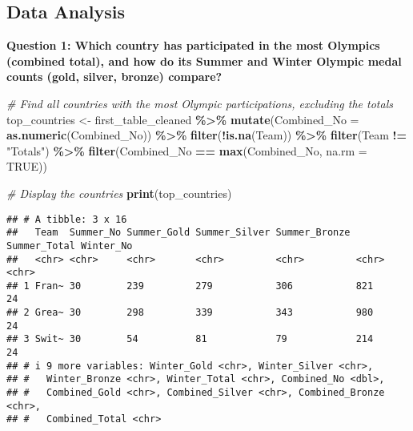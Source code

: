 \documentclass[
]{article}
\newenvironment{Shaded}{\begin{snugshade}}{\end{snugshade}}
\newcommand{\AttributeTok}[1]{\textcolor[rgb]{0.13,0.29,0.53}{#1}}
\newcommand{\CommentTok}[1]{\textcolor[rgb]{0.56,0.35,0.01}{\textit{#1}}}
\newcommand{\ConstantTok}[1]{\textcolor[rgb]{0.56,0.35,0.01}{#1}}
\newcommand{\FunctionTok}[1]{\textcolor[rgb]{0.13,0.29,0.53}{\textbf{#1}}}
\newcommand{\NormalTok}[1]{#1}
\newcommand{\OtherTok}[1]{\textcolor[rgb]{0.56,0.35,0.01}{#1}}
\newcommand{\SpecialCharTok}[1]{\textcolor[rgb]{0.81,0.36,0.00}{\textbf{#1}}}
\newcommand{\StringTok}[1]{\textcolor[rgb]{0.31,0.60,0.02}{#1}}
\begin{document}
\subsection{Data Analysis}\label{data-analysis}

\textbf{Question 1: Which country has participated in the most Olympics
(combined total), and how do its Summer and Winter Olympic medal counts
(gold, silver, bronze) compare?}

\begin{Shaded}
\begin{Highlighting}[]
\CommentTok{\# Find all countries with the most Olympic participations, excluding the totals}
\NormalTok{top\_countries }\OtherTok{\textless{}{-}}\NormalTok{ first\_table\_cleaned }\SpecialCharTok{\%\textgreater{}\%}
  \FunctionTok{mutate}\NormalTok{(}\AttributeTok{Combined\_No =} \FunctionTok{as.numeric}\NormalTok{(Combined\_No)) }\SpecialCharTok{\%\textgreater{}\%}
  \FunctionTok{filter}\NormalTok{(}\SpecialCharTok{!}\FunctionTok{is.na}\NormalTok{(Team)) }\SpecialCharTok{\%\textgreater{}\%} 
  \FunctionTok{filter}\NormalTok{(Team }\SpecialCharTok{!=} \StringTok{"Totals"}\NormalTok{) }\SpecialCharTok{\%\textgreater{}\%}
  \FunctionTok{filter}\NormalTok{(Combined\_No }\SpecialCharTok{==} \FunctionTok{max}\NormalTok{(Combined\_No, }\AttributeTok{na.rm =} \ConstantTok{TRUE}\NormalTok{))}

\CommentTok{\# Display the countries}
\FunctionTok{print}\NormalTok{(top\_countries)}
\end{Highlighting}
\end{Shaded}

\begin{verbatim}
## # A tibble: 3 x 16
##   Team  Summer_No Summer_Gold Summer_Silver Summer_Bronze Summer_Total Winter_No
##   <chr> <chr>     <chr>       <chr>         <chr>         <chr>        <chr>    
## 1 Fran~ 30        239         279           306           821          24       
## 2 Grea~ 30        298         339           343           980          24       
## 3 Swit~ 30        54          81            79            214          24       
## # i 9 more variables: Winter_Gold <chr>, Winter_Silver <chr>,
## #   Winter_Bronze <chr>, Winter_Total <chr>, Combined_No <dbl>,
## #   Combined_Gold <chr>, Combined_Silver <chr>, Combined_Bronze <chr>,
## #   Combined_Total <chr>
\end{verbatim}
\end{document}
